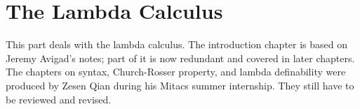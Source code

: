 \documentclass[../../include/open-logic-part]{subfiles}
\begin{document}
\part{The Lambda Calculus}

\begin{editorial}
This part deals with the lambda calculus. The introduction chapter is
based on Jeremy Avigad's notes; part of it is now redundant and covered in
later chapters. The chapters on syntax, Church-Rosser property, and
lambda definability were produced by Zesen Qian during his Mitacs summer
internship. They still have to be reviewed and revised.
\end{editorial}





\OLEndPartHook
\end{document}
